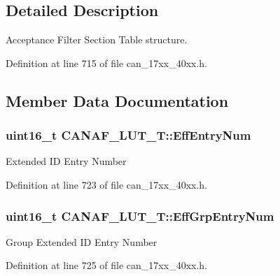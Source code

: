 \subsection{Detailed Description}
Acceptance Filter Section Table structure. 

Definition at line 715 of file can\+\_\+17xx\+\_\+40xx.\+h.



\subsection{Member Data Documentation}
\subsubsection[{\texorpdfstring{Eff\+Entry\+Num}{EffEntryNum}}]{\setlength{\rightskip}{0pt plus 5cm}uint16\+\_\+t C\+A\+N\+A\+F\+\_\+\+L\+U\+T\+\_\+\+T\+::\+Eff\+Entry\+Num}\hypertarget{structCANAF__LUT__T_a62d74093f87bfd355f53f143b022e3ce}{}\label{structCANAF__LUT__T_a62d74093f87bfd355f53f143b022e3ce}
Extended ID Entry Number 

Definition at line 723 of file can\+\_\+17xx\+\_\+40xx.\+h.

\subsubsection[{\texorpdfstring{Eff\+Grp\+Entry\+Num}{EffGrpEntryNum}}]{\setlength{\rightskip}{0pt plus 5cm}uint16\+\_\+t C\+A\+N\+A\+F\+\_\+\+L\+U\+T\+\_\+\+T\+::\+Eff\+Grp\+Entry\+Num}\hypertarget{structCANAF__LUT__T_a48493bdab0f7818be7082e61284994d8}{}\label{structCANAF__LUT__T_a48493bdab0f7818be7082e61284994d8}
Group Extended ID Entry Number 

Definition at line 725 of file can\+\_\+17xx\+\_\+40xx.\+h.


